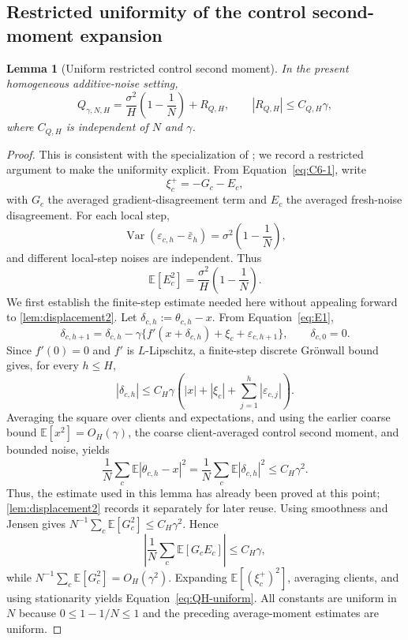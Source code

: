 \documentclass[11pt]{article}
\newtheorem{lemma}[lemma]{Lemma}
\theoremstyle{definition}
\newcommand{\E}{\mathbb{E}}
\newcommand{\Var}{\operatorname{Var}}
\newcommand{\QH}{Q_{\gamma,N,H}}
\newcommand{\eps}{\varepsilon}
\newcommand{\delt}{\delta}
\begin{document}
\subsection{Restricted uniformity of the control second-moment expansion}

\begin{lemma}[Uniform restricted control second moment]
\label{lem:QH-uniform}
In the present homogeneous additive-noise setting,
\begin{equation}
\label{eq:QH-uniform}
  \QH=\frac{\sigma^2}{H}\left(1-\frac1N\right)+R_{Q,H},
  \qquad |R_{Q,H}|\le C_{Q,H}\gamma,
\end{equation}
where $C_{Q,H}$ is independent of $N$ and $\gamma$.
\end{lemma}

\begin{proof}
This is consistent with the specialization of \citet[Lemma~5.1]{mangold2025scaffold}; we record a restricted argument to make the uniformity explicit. From Equation~\eqref{eq:C6-1}, write
\[
  \xi_c^+=-G_c-E_c,
\]
with $G_c$ the averaged gradient-disagreement term and $E_c$ the averaged fresh-noise disagreement. For each local step,
\[
  \Var(\eps_{c,h}-\bar\eps_h)=\sigma^2\left(1-\frac1N\right),
\]
and different local-step noises are independent. Thus
\begin{equation}
\label{eq:Ec-var}
  \E[E_c^2]=\frac{\sigma^2}{H}\left(1-\frac1N\right).
\end{equation}
We first establish the finite-step estimate needed here without appealing forward to \cref{lem:displacement2}. Let
$\delt_{c,h}:=\theta_{c,h}-x$. From Equation~\eqref{eq:E1},
\[
  \delt_{c,h+1}=\delt_{c,h}
  -\gamma\{f'(x+\delt_{c,h})+\xi_c+\eps_{c,h+1}\},
  \qquad \delt_{c,0}=0.
\]
Since $f'(0)=0$ and $f'$ is $L$-Lipschitz, a finite-step discrete Gr\"onwall bound gives, for every $h\le H$,
\[
  |\delt_{c,h}|
  \le C_H\gamma\left(|x|+|\xi_c|+\sum_{j=1}^h|\eps_{c,j}|\right).
\]
    Averaging the square over clients and expectations, and using the earlier coarse bound
$\E[x^2]=O_H(\gamma)$, the coarse client-averaged control second moment, and bounded noise, yields
\[
  \frac1N\sum_c\E|\theta_{c,h}-x|^2
  =\frac1N\sum_c\E|\delt_{c,h}|^2
  \le C_H\gamma^2.
\]
Thus, the estimate used in this lemma has already been proved at this point; \cref{lem:displacement2} records it separately for later reuse.
Using smoothness and Jensen gives $N^{-1}\sum_c\E[G_c^2]\le C_H\gamma^2$. Hence
\[
  \left|\frac1N\sum_c\E[G_cE_c]\right|
  \le C_H\gamma,
\]
while $N^{-1}\sum_c\E[G_c^2]=O_H(\gamma^2)$. Expanding $\E[(\xi_c^+)^2]$, averaging clients, and using stationarity yields Equation~\eqref{eq:QH-uniform}. All constants are uniform in $N$ because $0\le1-1/N\le1$ and the preceding average-moment estimates are uniform.
\end{proof}
\end{document}
